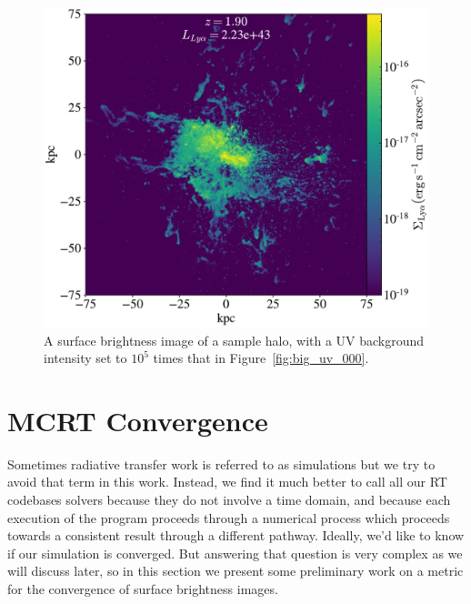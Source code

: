 \begin{figure}
    \centering
    \includegraphics[width=\textwidth,keepaspectratio]{figures/big_uvb_005.pdf}
    \caption{
        A surface brightness image of a sample halo, with a UV background intensity set to $10^{5}$ times that in Figure~\ref{fig:big_uv_000}.
    }
  \label{fig:big_uv_005}
\end{figure}



\section{MCRT Convergence}
Sometimes radiative transfer work is referred to as simulations but we try to avoid that term in this work.
Instead, we find it much better to call all our RT codebases solvers because they do not involve a time domain, and because each execution of the program proceeds through a numerical process which proceeds towards a consistent result through a different pathway.
Ideally, we'd like to know if our simulation is converged.
But answering that question is very complex as we will discuss later, so in this section we present some preliminary work on a metric for the convergence of surface brightness images.

